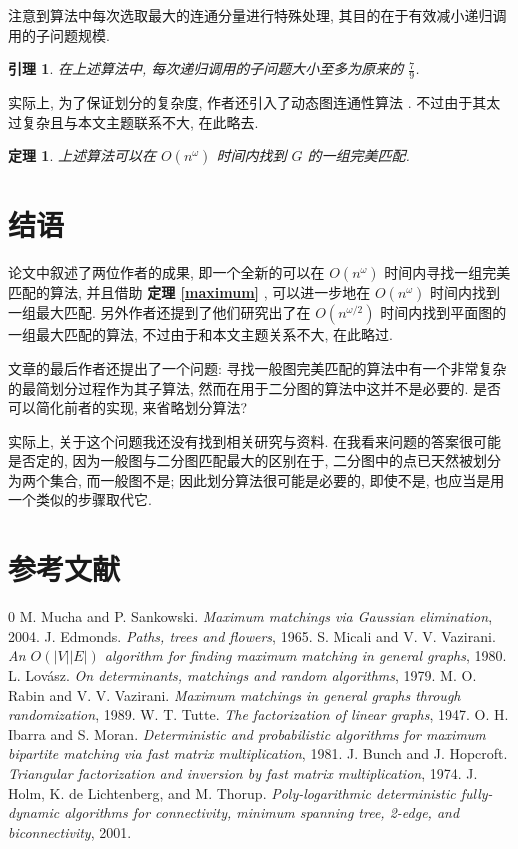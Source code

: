 \documentclass[a4paper]{article}
\newtheorem{theorem}{\hspace{2em}定理}
\newtheorem*{lemma}{\hspace{2em}引理}
\begin{document}
				注意到算法中每次选取最大的连通分量进行特殊处理, 其目的在于有效减小递归调用的子问题规模.
				
				\begin{lemma}
					在上述算法中, 每次递归调用的子问题大小至多为原来的 $\frac 7 9$.
					\label{frac79}
				\end{lemma}

				实际上, 为了保证划分的复杂度, 作者还引入了动态图连通性算法 \cite{dynamic} . 不过由于其太过复杂且与本文主题联系不大, 在此略去.

				\begin{theorem}
					上述算法可以在 $O(n^\omega)$ 时间内找到 $G$ 的一组完美匹配.
				\end{theorem}


	\section{结语}
		\hspace{2em}论文中叙述了两位作者的成果, 即一个全新的可以在 $O(n^\omega)$ 时间内寻找一组完美匹配的算法, 并且借助 {\bfseries 定理 \ref{maximum}} , 可以进一步地在 $O(n^\omega)$ 时间内找到一组最大匹配. 另外作者还提到了他们研究出了在 $O(n^{\omega / 2})$ 时间内找到平面图的一组最大匹配的算法, 不过由于和本文主题关系不大, 在此略过.

		文章的最后作者还提出了一个问题: 寻找一般图完美匹配的算法中有一个非常复杂的最简划分过程作为其子算法, 然而在用于二分图的算法中这并不是必要的. 是否可以简化前者的实现, 来省略划分算法?
		
		实际上, 关于这个问题我还没有找到相关研究与资料. 在我看来问题的答案很可能是否定的, 因为一般图与二分图匹配最大的区别在于, 二分图中的点已天然被划分为两个集合, 而一般图不是; 因此划分算法很可能是必要的, 即使不是, 也应当是用一个类似的步骤取代它.

	\section{参考文献}

		\begin{thebibliography} {0}
			 M. Mucha and P. Sankowski. \emph{Maximum matchings via Gaussian elimination}, 2004.
			 J. Edmonds. \emph{Paths, trees and flowers}, 1965.
			 S. Micali and V. V. Vazirani. \emph{An $O(|V||E|)$ algorithm for finding maximum matching in general graphs}, 1980.
			 L. Lov\'asz. \emph{On determinants, matchings and random algorithms}, 1979.
			 M. O. Rabin and V. V. Vazirani. \emph{Maximum matchings in general graphs through randomization}, 1989.
			 W. T. Tutte. \emph{The factorization of linear graphs}, 1947.
			 O. H. Ibarra and S. Moran. \emph{Deterministic and probabilistic algorithms for maximum bipartite matching via fast matrix multiplication}, 1981.
			 J. Bunch and J. Hopcroft. \emph{Triangular factorization and inversion by fast matrix multiplication}, 1974.
			 J. Holm, K. de Lichtenberg, and M. Thorup. \emph{Poly-logarithmic deterministic fully-dynamic algorithms for connectivity, minimum spanning tree, 2-edge, and biconnectivity}, 2001.
		\end{thebibliography}
\end{document}
